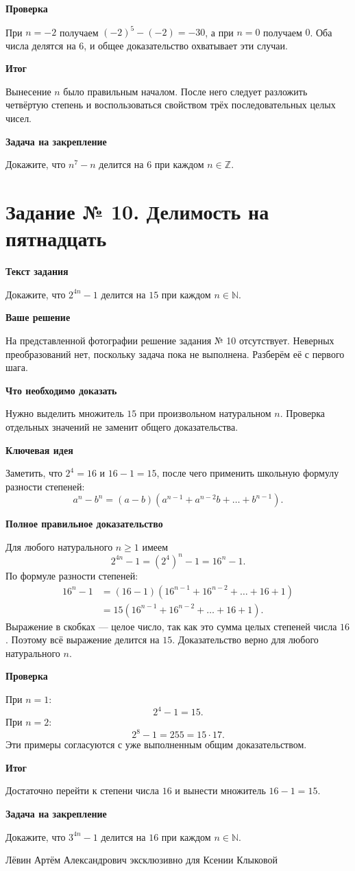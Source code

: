 \documentclass[12pt,a4paper]{article}
\newcommand{\parthead}[1]{\par\medskip\textbf{#1}\par\smallskip}
\begin{document}
\parthead{Проверка}
При $n=-2$ получаем $(-2)^5-(-2)=-30$, а при $n=0$ получаем $0$. Оба числа делятся на $6$, и общее доказательство охватывает эти случаи.

\parthead{\textcolor{teal!60!black}{Итог}}
Вынесение $n$ было правильным началом. После него следует разложить четвёртую степень и воспользоваться свойством трёх последовательных целых чисел.

\parthead{Задача на закрепление}
Докажите, что $n^7-n$ делится на $6$ при каждом $n\in\mathbb Z$.

\clearpage
{}\label{task:10}
\section*{Задание № 10. Делимость на пятнадцать}
\parthead{Текст задания}
Докажите, что $2^{4n}-1$ делится на $15$ при каждом $n\in\mathbb N$.

\parthead{Ваше решение}
На представленной фотографии решение задания № 10 отсутствует. Неверных преобразований нет, поскольку задача пока не выполнена. Разберём её с первого шага.

\parthead{Что необходимо доказать}
Нужно выделить множитель $15$ при произвольном натуральном $n$. Проверка отдельных значений не заменит общего доказательства.

\parthead{\textcolor{blue!60!black}{Ключевая идея}}
Заметить, что $2^4=16$ и $16-1=15$, после чего применить школьную формулу разности степеней:
\[
a^n-b^n=(a-b)(a^{n-1}+a^{n-2}b+\dots+b^{n-1}).
\]

\parthead{Полное правильное доказательство}
Для любого натурального $n\ge1$ имеем
\[
2^{4n}-1=(2^4)^n-1=16^n-1.
\]
По формуле разности степеней:
\[
\begin{aligned}
16^n-1
&=(16-1)(16^{n-1}+16^{n-2}+\dots+16+1)\\
&=15(16^{n-1}+16^{n-2}+\dots+16+1).
\end{aligned}
\]
Выражение в скобках --- целое число, так как это сумма целых степеней числа $16$. Поэтому всё выражение делится на $15$. Доказательство верно для любого натурального $n$.

\parthead{Проверка}
При $n=1$:
\[
2^4-1=15.
\]
При $n=2$:
\[
2^8-1=255=15\cdot17.
\]
Эти примеры согласуются с уже выполненным общим доказательством.

\parthead{\textcolor{teal!60!black}{Итог}}
Достаточно перейти к степени числа $16$ и вынести множитель $16-1=15$.

\parthead{Задача на закрепление}
Докажите, что $3^{4n}-1$ делится на $16$ при каждом $n\in\mathbb N$.

\vfill
\begin{center}
\small Лёвин Артём Александрович эксклюзивно для Ксении Клыковой
\end{center}
\end{document}
